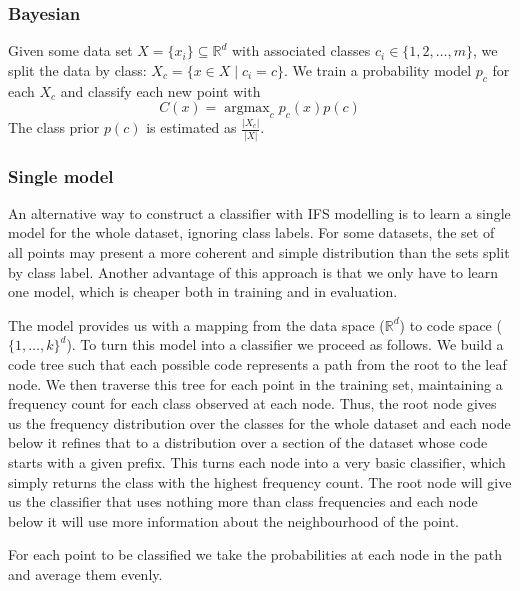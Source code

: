 \documentclass[10pt,a4paper,oneside]{article}
\theoremstyle{definition}
\DeclareMathOperator*{\argmax}{argmax}
\begin{document}
\subsubsection*{Bayesian}

Given some data set $X = \{x_i\} \subseteq {\mathbb R}^d$ with associated classes $c_i \in \{1, 2, \ldots, m\}$, we split the data by class: $X_c = \{ x \in X \mid c_i = c\}$. We train a probability model $p_c$ for each $X_c$ and classify each new point with
\[
C(x) = \argmax_{c} p_c(x) p(c)
\]
The class prior $p(c)$ is estimated as $\frac{|X_c|}{|X|}$.

\subsubsection*{Single model}

An alternative way to construct a classifier with IFS modelling is to learn a single model for the whole dataset, ignoring class labels. For some datasets, the set of all points may present a more coherent and simple distribution than the sets split by class label. Another advantage of this approach is that we only have to learn one model, which is cheaper both in training and in evaluation.

The model provides us with a mapping from the data space (${\mathbb R}^d$) to code space ($\{1, \ldots, k\}^d$). To turn this model into a classifier we proceed as follows. We build a code tree such that each possible code represents a path from the root to the leaf node. We then traverse this tree for each point in the training set, maintaining a frequency count for each class observed at each node. Thus, the root node gives us the frequency distribution over the classes for the whole dataset and each node below it refines that to a distribution over a section of the dataset whose code starts with a given prefix. This turns each node into a very basic classifier, which simply returns the class with the highest frequency count. The root node will give us the classifier that uses nothing more than class frequencies and each node below it will use more information about the neighbourhood of the point.

For each point to be classified we take the probabilities at each node in the path and average them evenly. 
\end{document}
